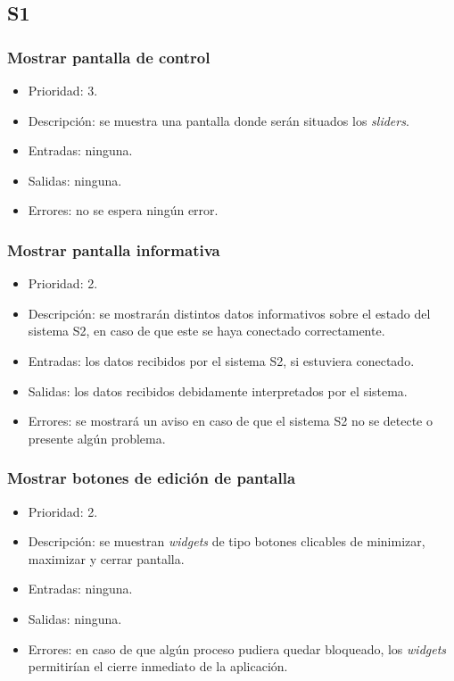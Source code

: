 \subsection*{\ac{S1}}
\subsubsection{Mostrar pantalla de control}
\begin{itemize}
    \item Prioridad: 3.
    \item Descripción: se muestra una pantalla donde serán situados los \textit{sliders}.
    \item Entradas: ninguna.
    \item Salidas: ninguna.
    \item Errores: no se espera ningún error.
\end{itemize}

\subsubsection{Mostrar pantalla informativa}
\begin{itemize}
    \item Prioridad: 2.
    \item Descripción: se mostrarán distintos datos informativos sobre el estado del sistema \ac{S2}, en caso de que este se haya conectado correctamente.
    \item Entradas: los datos recibidos por el sistema \ac{S2}, si estuviera conectado.
    \item Salidas: los datos recibidos debidamente interpretados por el sistema.
    \item Errores: se mostrará un aviso en caso de que el sistema \ac{S2} no se detecte o presente algún problema.
\end{itemize}

\subsubsection{Mostrar botones de edición de pantalla}
\begin{itemize}
    \item Prioridad: 2.
    \item Descripción: se muestran \textit{widgets} de tipo botones clicables de minimizar, maximizar y cerrar pantalla.
    \item Entradas: ninguna.
    \item Salidas: ninguna.
    \item Errores: en caso de que algún proceso pudiera quedar bloqueado, los \textit{widgets} permitirían el cierre inmediato de la aplicación.
\end{itemize}

